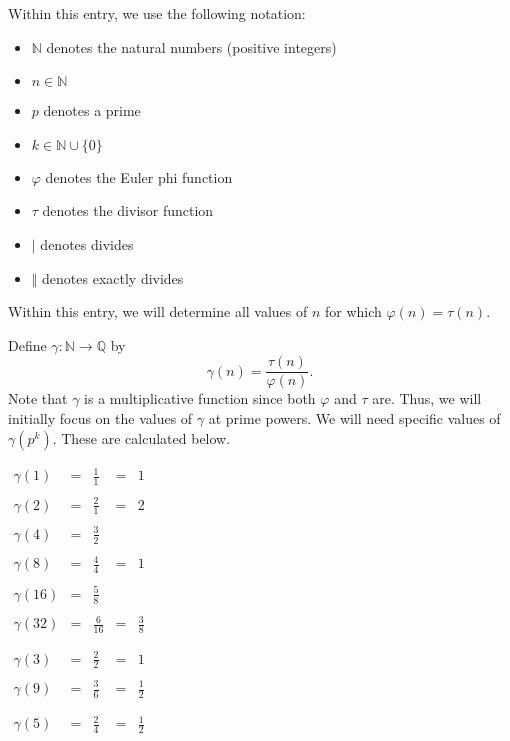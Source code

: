 \documentclass[12pt]{article}
\newcommand{\ds}{\displaystyle}
\renewcommand{\phi}{\varphi}
\begin{document}

Within this entry, we use the following notation:
\begin{itemize}
\item $\mathbb{N}$ denotes the natural numbers (positive integers)
\item $n\in\mathbb{N}$
\item $p$ denotes a prime
\item $k\in\mathbb{N}\cup\{0\}$
\item $\phi$ denotes the Euler phi function
\item $\tau$ denotes the divisor function
\item $\mid$ denotes divides
\item $\Vert$ denotes exactly divides
\end{itemize}

Within this entry, we will determine all values of $n$ for which $\phi(n)=\tau(n)$.

Define $\gamma \colon \mathbb{N} \to \mathbb{Q}$ by
\[
\gamma(n)=\frac{\tau(n)}{\phi(n)}.
\]
Note that $\gamma$ is a multiplicative function since both $\phi$ and $\tau$ are.  Thus, we will initially focus on the values of $\gamma$ at prime powers.  We will need specific values of $\gamma(p^k)$.  These are calculated below.

\begin{center}
$\begin{array}{ccccc}
\gamma(1)  &=& \ds \frac{1}{1}  &=& 1 \\ \\
\gamma(2)  &=& \ds \frac{2}{1}  &=& 2 \\ \\
\gamma(4)  &=& \ds \frac{3}{2} \\ \\
\gamma(8)  &=& \ds \frac{4}{4}  &=& 1 \\ \\
\gamma(16) &=& \ds \frac{5}{8} \\ \\
\gamma(32) &=& \ds \frac{6}{16} &=& \ds \frac{3}{8} \\ \\ \\
\gamma(3)  &=& \ds \frac{2}{2}  &=& 1 \\ \\
\gamma(9)  &=& \ds \frac{3}{6}  &=& \ds \frac{1}{2} \\ \\ \\
\gamma(5)  &=& \ds \frac{2}{4}  &=& \ds \frac{1}{2}
\end{array}$
\end{center}
\end{document}
